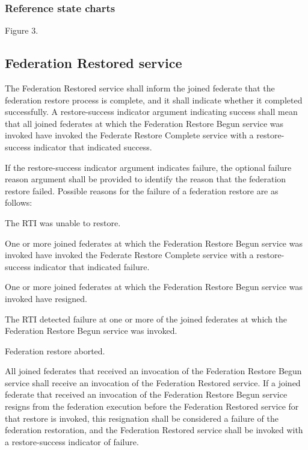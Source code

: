 \subsubsection{Reference state charts}

\begin{stdalphalist}
    \item Figure 3.
\end{stdalphalist}

\subsection{Federation Restored \rtiinitiated{} service}

The Federation Restored \rtiinitiated{} service shall inform the joined federate that the federation restore process is complete, and it shall indicate whether it completed successfully. A restore-success indicator argument indicating success shall mean that all joined federates at which the Federation Restore Begun \rtiinitiated{} service was invoked have invoked the Federate Restore Complete service with a restore-success indicator that indicated success.

If the restore-success indicator argument indicates failure, the optional failure reason argument shall be provided to identify the reason that the federation restore failed. Possible reasons for the failure of a federation restore are as follows:

\begin{stddashlist}
    \item The RTI was unable to restore.
    \item One or more joined federates at which the Federation Restore Begun \rtiinitiated{} service was invoked have invoked the Federate Restore Complete service with a restore-success indicator that indicated failure.
    \item One or more joined federates at which the Federation Restore Begun \rtiinitiated{} service was invoked have resigned.
    \item The RTI detected failure at one or more of the joined federates at which the Federation Restore Begun \rtiinitiated{} service was invoked.
    \item Federation restore aborted.
\end{stddashlist}

All joined federates that received an invocation of the Federation Restore Begun \rtiinitiated{} service shall receive an invocation of the Federation Restored \rtiinitiated{} service. If a joined federate that received an invocation of the Federation Restore Begun \rtiinitiated{} service resigns from the federation execution before the Federation Restored \rtiinitiated{} service for that restore is invoked, this resignation shall be considered a failure of the federation restoration, and the Federation Restored \rtiinitiated{} service shall be invoked with a restore-success indicator of failure.

